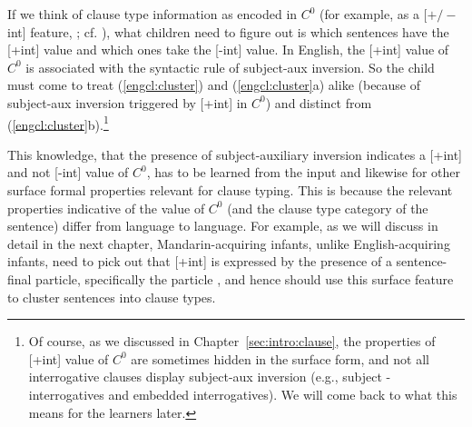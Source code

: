 If we think of clause type information as encoded in $C^{0}$ (for example, as a [$+/-$ int] feature,  \cite{chomskylasnik1977,rizzi1997}; cf. \cite{rizzi2001int}), what children need to figure out is which sentences have the [+int] value and which ones take the [-int] value. In English, the [+int] value of $C^{0}$ is associated with the syntactic rule of subject-aux inversion. So the child must come to treat (\ref{engcl:cluster}) and (\ref{engcl:cluster}a) alike (because of subject-aux inversion triggered by [+int] in $C^{0}$) and distinct from (\ref{engcl:cluster}b).\footnote{Of course, as we discussed in Chapter~\ref{sec:intro:clause}, the properties of [+int] value of $C^{0}$ are sometimes hidden in the surface form, and not all interrogative clauses display subject-aux inversion (e.g., subject \twh-interrogatives and embedded interrogatives). We will come back to what this means for the learners later.} 

This knowledge, that the presence of subject-auxiliary inversion indicates a [+int] and not [-int] value of $C^{0}$, has to be learned from the input and likewise for other surface formal properties relevant for clause typing. This is because the relevant properties indicative of the value of $C^{0}$ (and the clause type category of the sentence) differ from language to language. For example, as we will discuss in detail in the next chapter, Mandarin-acquiring infants, unlike English-acquiring infants, need to pick out that [+int] is expressed by the presence of a sentence-final particle, specifically the particle , and hence should use this surface feature to cluster sentences into clause types.



